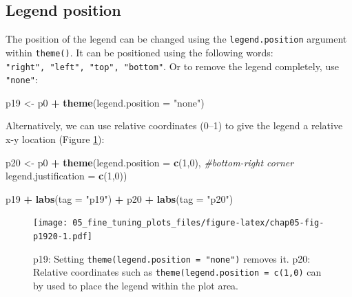 \documentclass[
  12pt,
  krantz2]{krantz}
\makeatletter
\newenvironment{Shaded}{\begin{snugshade}}{\end{snugshade}}
\newcommand{\CommentTok}[1]{\textcolor[rgb]{0.56,0.35,0.01}{\textit{#1}}}
\newcommand{\DataTypeTok}[1]{\textcolor[rgb]{0.13,0.29,0.53}{#1}}
\newcommand{\DecValTok}[1]{\textcolor[rgb]{0.00,0.00,0.81}{#1}}
\newcommand{\KeywordTok}[1]{\textcolor[rgb]{0.13,0.29,0.53}{\textbf{#1}}}
\newcommand{\NormalTok}[1]{#1}
\newcommand{\OperatorTok}[1]{\textcolor[rgb]{0.81,0.36,0.00}{\textbf{#1}}}
\newcommand{\StringTok}[1]{\textcolor[rgb]{0.31,0.60,0.02}{#1}}
\newenvironment{kframe}{%
\medskip{}
\setlength{\fboxsep}{.8em}
 \def\at@end@of@kframe{}%
 \ifinner\ifhmode%
  \def\at@end@of@kframe{\end{minipage}}%
  \begin{minipage}{\columnwidth}%
 \fi\fi%
 \def\FrameCommand##1{\hskip\@totalleftmargin \hskip-\fboxsep
 \colorbox{shadecolor}{##1}\hskip-\fboxsep
     \hskip-\linewidth \hskip-\@totalleftmargin \hskip\columnwidth}%
 \MakeFramed {\advance\hsize-\width
   \@totalleftmargin\z@ \linewidth\hsize
   \@setminipage}}%
 {\par\unskip\endMakeFramed%
 \at@end@of@kframe}
\renewenvironment{Shaded}{\begin{kframe}}{\end{kframe}}
\makeatother
\begin{document}
\hypertarget{legend-position}{%
\subsection{Legend position}\label{legend-position}}


The position of the legend can be changed using the \texttt{legend.position} argument within \texttt{theme()}. It can be positioned using the following words: \texttt{"right",\ "left",\ "top",\ "bottom"}.
Or to remove the legend completely, use \texttt{"none"}:

\begin{Shaded}
\begin{Highlighting}[]
\NormalTok{p19 <-}\StringTok{ }\NormalTok{p0 }\OperatorTok{+}
\StringTok{  }\KeywordTok{theme}\NormalTok{(}\DataTypeTok{legend.position =} \StringTok{"none"}\NormalTok{)}
\end{Highlighting}
\end{Shaded}

Alternatively, we can use relative coordinates (0--1) to give the legend a relative x-y location (Figure \ref{fig:chap05-fig-p1920}):

\begin{Shaded}
\begin{Highlighting}[]
\NormalTok{p20 <-}\StringTok{ }\NormalTok{p0 }\OperatorTok{+}
\StringTok{  }\KeywordTok{theme}\NormalTok{(}\DataTypeTok{legend.position      =} \KeywordTok{c}\NormalTok{(}\DecValTok{1}\NormalTok{,}\DecValTok{0}\NormalTok{), }\CommentTok{#bottom-right corner}
        \DataTypeTok{legend.justification =} \KeywordTok{c}\NormalTok{(}\DecValTok{1}\NormalTok{,}\DecValTok{0}\NormalTok{)) }
\end{Highlighting}
\end{Shaded}

\begin{Shaded}
\begin{Highlighting}[]
\NormalTok{p19 }\OperatorTok{+}\StringTok{ }\KeywordTok{labs}\NormalTok{(}\DataTypeTok{tag =} \StringTok{"p19"}\NormalTok{) }\OperatorTok{+}\StringTok{ }\NormalTok{p20 }\OperatorTok{+}\StringTok{ }\KeywordTok{labs}\NormalTok{(}\DataTypeTok{tag =} \StringTok{"p20"}\NormalTok{)}
\end{Highlighting}
\end{Shaded}

\begin{figure}
\centering
\texttt{[image: 05\_fine\_tuning\_plots\_files/figure-latex/chap05-fig-p1920-1.pdf]}
\caption{\label{fig:chap05-fig-p1920}p19: Setting \texttt{theme(legend.position\ =\ "none")} removes it. p20: Relative coordinates such as \texttt{theme(legend.position\ =\ c(1,0)} can by used to place the legend within the plot area.}
\end{figure}
\end{document}
